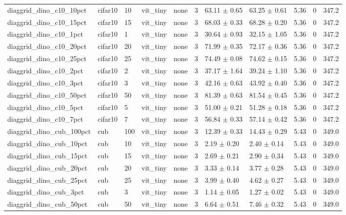 \begin{tabular}{lllllllllll}
diaggrid_dino_c10_10pct & cifar10 & 10 & vit_tiny & none & 3 & 63.11 $\pm$ 0.65 & 63.25 $\pm$ 0.61 & 5.36 & 0 & 347.2 \\
diaggrid_dino_c10_15pct & cifar10 & 15 & vit_tiny & none & 3 & 68.03 $\pm$ 0.33 & 68.28 $\pm$ 0.20 & 5.36 & 0 & 347.2 \\
diaggrid_dino_c10_1pct & cifar10 & 1 & vit_tiny & none & 3 & 30.64 $\pm$ 0.93 & 32.15 $\pm$ 1.05 & 5.36 & 0 & 347.2 \\
diaggrid_dino_c10_20pct & cifar10 & 20 & vit_tiny & none & 3 & 71.99 $\pm$ 0.35 & 72.17 $\pm$ 0.36 & 5.36 & 0 & 347.2 \\
diaggrid_dino_c10_25pct & cifar10 & 25 & vit_tiny & none & 3 & 74.49 $\pm$ 0.08 & 74.62 $\pm$ 0.15 & 5.36 & 0 & 347.2 \\
diaggrid_dino_c10_2pct & cifar10 & 2 & vit_tiny & none & 3 & 37.17 $\pm$ 1.64 & 39.24 $\pm$ 1.10 & 5.36 & 0 & 347.2 \\
diaggrid_dino_c10_3pct & cifar10 & 3 & vit_tiny & none & 3 & 42.16 $\pm$ 0.63 & 43.92 $\pm$ 0.40 & 5.36 & 0 & 347.2 \\
diaggrid_dino_c10_50pct & cifar10 & 50 & vit_tiny & none & 3 & 81.39 $\pm$ 0.63 & 81.54 $\pm$ 0.45 & 5.36 & 0 & 347.2 \\
diaggrid_dino_c10_5pct & cifar10 & 5 & vit_tiny & none & 3 & 51.00 $\pm$ 0.21 & 51.28 $\pm$ 0.18 & 5.36 & 0 & 347.2 \\
diaggrid_dino_c10_7pct & cifar10 & 7 & vit_tiny & none & 3 & 56.84 $\pm$ 0.33 & 57.14 $\pm$ 0.42 & 5.36 & 0 & 347.2 \\
diaggrid_dino_cub_100pct & cub & 100 & vit_tiny & none & 3 & 12.39 $\pm$ 0.33 & 14.43 $\pm$ 0.29 & 5.43 & 0 & 349.0 \\
diaggrid_dino_cub_10pct & cub & 10 & vit_tiny & none & 3 & 2.19 $\pm$ 0.20 & 2.40 $\pm$ 0.14 & 5.43 & 0 & 349.0 \\
diaggrid_dino_cub_15pct & cub & 15 & vit_tiny & none & 3 & 2.69 $\pm$ 0.21 & 2.90 $\pm$ 0.34 & 5.43 & 0 & 349.0 \\
diaggrid_dino_cub_20pct & cub & 20 & vit_tiny & none & 3 & 3.33 $\pm$ 0.14 & 3.77 $\pm$ 0.28 & 5.43 & 0 & 349.0 \\
diaggrid_dino_cub_25pct & cub & 25 & vit_tiny & none & 3 & 3.99 $\pm$ 0.40 & 4.62 $\pm$ 0.27 & 5.43 & 0 & 349.0 \\
diaggrid_dino_cub_3pct & cub & 3 & vit_tiny & none & 3 & 1.14 $\pm$ 0.05 & 1.27 $\pm$ 0.02 & 5.43 & 0 & 349.0 \\
diaggrid_dino_cub_50pct & cub & 50 & vit_tiny & none & 3 & 6.64 $\pm$ 0.51 & 7.46 $\pm$ 0.32 & 5.43 & 0 & 349.0 \\

\end{tabular}
